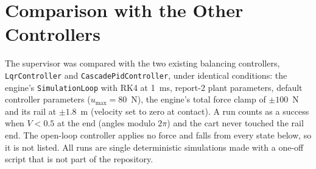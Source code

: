 \documentclass[11pt,a4paper]{article}
\newcommand{\code}[1]{\texttt{#1}}
\newcommand{\umax}{u_{\max}}
\begin{document}
\section{Comparison with the Other Controllers}\label{sec:compare}
The supervisor was compared with the two existing balancing controllers, \code{LqrController}
and \code{CascadePidController}, under identical conditions: the engine's
\code{SimulationLoop} with RK4 at 1~ms, report-2 plant parameters, default controller
parameters ($\umax = 80$~N), the engine's total force clamp of $\pm 100$~N and its rail at
$\pm 1.8$~m (velocity set to zero at contact). A run counts as a success when $V < 0.5$ at the
end (angles modulo $2\pi$) and the cart never touched the rail end. The open-loop controller
applies no force and falls from every state below, so it is not listed. All runs are single
deterministic simulations made with a one-off script that is not part of the repository.
\end{document}
